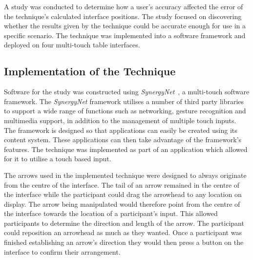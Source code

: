 \documentclass{bmcart}
\begin{document}
A study was conducted to determine how a user's accuracy affected the error of the technique's calculated interface positions.
The study focused on discovering whether the results given by the technique could be accurate enough for use in a specific scenario.
The technique was implemented into a software framework and deployed on four multi-touch table interfaces.

\subsection*{Implementation of the Technique}\label{sec:implementation}


Software for the study was constructed using {\emph{SynergyNet}}~\cite{AlAgha2010}, a multi-touch software framework.
The {\emph{SynergyNet}} framework utilises a number of third party libraries to support a wide range of functions such as networking, gesture recognition and multimedia support, in addition to the management of multiple touch inputs.
The framework is designed so that applications can easily be created using its content system.
These applications can then take advantage of the framework's features.
The technique was implemented as part of an application which allowed for it to utilise a touch based input.

The arrows used in the implemented technique were designed to always originate from the centre of the interface.
The tail of an arrow remained in the centre of the interface while the participant could drag the arrowhead to any location on display.
The arrow being manipulated would therefore point from the centre of the interface towards the location of a participant's input.
This allowed participants to determine the direction and length of the arrow.
The participant could reposition an arrowhead as much as they wanted.
Once a participant was finished establishing an arrow's direction they would then press a button on the interface to confirm their arrangement.
\end{document}
